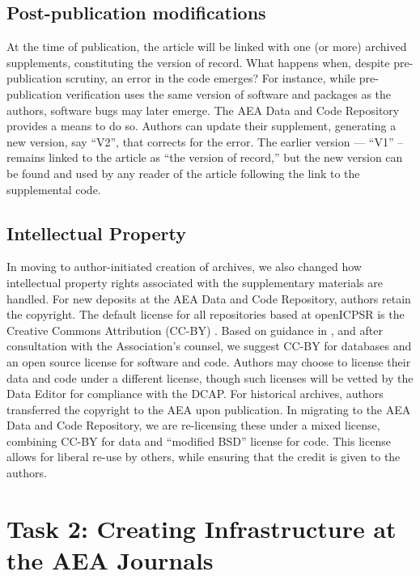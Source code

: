 \documentclass[PP]{AEA}
\newcommand{\aeadcr}{AEA Data and Code Repository}
\begin{document}
\subsection{Post-publication modifications}

At the time of publication, the article will be linked with one (or more) archived supplements, constituting the version of record. What happens when, despite pre-publication scrutiny, an error in the code emerges? For instance, while pre-publication verification uses the same version of software and packages as the authors, software bugs may later emerge. The \aeadcr{} provides a means to do so. Authors can update their supplement, generating a new version, say  ``V2'', that corrects for the error. The earlier version --- ``V1'' -- remains linked to the article as ``the version of record,'' but the new version can be found and used by any reader of the article following the link to the supplemental code. 


\subsection{Intellectual Property} 
\label{sec:ip}
In moving to author-initiated creation of archives, we  also changed how intellectual property rights associated with  the supplementary materials are handled. For new deposits at the \aeadcr{}, authors retain the copyright. The default license for all repositories based at openICPSR is the  Creative Commons Attribution (CC-BY) \citep{CreativeCommons2017}. Based on guidance  in \citet{StoddenSoftwarePatentsBarrier2012},  and after consultation with the Association's counsel, we suggest CC-BY for databases and an open source license \citep{OpenSourceInitiative2018} for software and code. Authors may choose to license their data and code under a different license, though such licenses will be vetted by the Data Editor for compliance with the \ac{DCAP}. 
%
For historical archives, authors transferred the copyright to the AEA upon publication. In migrating to the \aeadcr{}, we are re-licensing these under a mixed license, combining CC-BY for data and ``modified BSD'' license for code. This license  allows for liberal re-use by others, while ensuring that the credit is given to the authors. 








\section{Task 2: Creating Infrastructure at the AEA Journals}
\label{sec:infrastructure}
\end{document}
